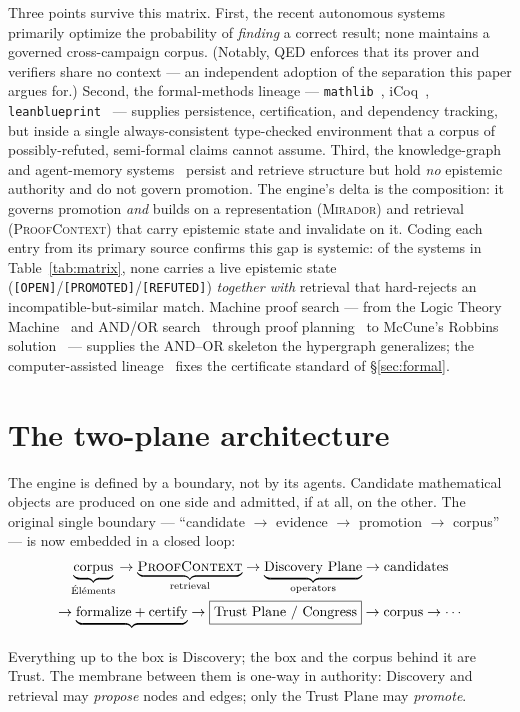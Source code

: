 \documentclass[11pt]{amsart}
\theoremstyle{definition}
\theoremstyle{remark}
\newcommand{\mirador}{\textsc{Mirador}}
\newcommand{\pc}{\textsc{ProofContext}}
\newcommand{\state}[1]{\texttt{[#1]}}
\begin{document}
\noindent Three points survive this matrix. First, the recent autonomous
systems~\cite{Aletheia26,QED26,RMA26} primarily optimize the probability of
\emph{finding} a correct result; none maintains a governed cross-campaign
corpus. (Notably, QED enforces that its prover and verifiers share no context ---
an independent adoption of the separation this paper argues for.) Second, the
formal-methods lineage --- \texttt{mathlib}~\cite{mathlib20},
iCoq~\cite{Celik17}, \texttt{leanblueprint}~\cite{Massot,Tao23} --- supplies
persistence, certification, and dependency tracking, but inside a single
always-consistent type-checked environment that a corpus of possibly-refuted,
semi-formal claims cannot assume. Third, the knowledge-graph and agent-memory
systems~\cite{TheoremGraph26,MaRDI23,Zep25,Yadav26} persist and retrieve
structure but hold \emph{no} epistemic authority and do not govern promotion.
The engine's delta is the composition: it governs promotion \emph{and} builds
on a representation (\mirador{}) and retrieval (\pc{}) that carry epistemic
state and invalidate on it. Coding each entry from its primary source confirms
this gap is systemic: of the systems in Table~\ref{tab:matrix}, none carries a live
epistemic state (\state{OPEN}/\state{PROMOTED}/\state{REFUTED}) \emph{together
with} retrieval that hard-rejects an incompatible-but-similar match. Machine
proof search --- from the Logic Theory
Machine~\cite{NewellSimon57} and AND/OR search~\cite{Nilsson71} through proof
planning~\cite{Bundy88} to McCune's Robbins solution~\cite{McCune97} --- supplies
the AND--OR skeleton the hypergraph generalizes; the computer-assisted
lineage~\cite{AppelHaken77,Gonthier08,Hales17,Heule16,deBruijn70} fixes the
certificate standard of \S\ref{sec:formal}.

\section{The two-plane architecture}\label{sec:planes}

The engine is defined by a boundary, not by its agents. Candidate mathematical
objects are produced on one side and admitted, if at all, on the other. The
original single boundary --- ``candidate $\to$ evidence $\to$ promotion $\to$
corpus'' --- is now embedded in a closed loop:
\[
\begin{gathered}
\underbrace{\text{corpus}}_{\text{\'El\'ements}}
\to
\underbrace{\pc{}}_{\text{retrieval}}
\to
\underbrace{\text{Discovery Plane}}_{\text{operators}}
\to
\text{candidates}\\
\to
\underbrace{\text{formalize}+\text{certify}}_{}
\to
\boxed{\text{Trust Plane / Congress}}
\to
\text{corpus}\to\cdots
\end{gathered}
\]
Everything up to the box is Discovery; the box and the corpus behind it are
Trust. The membrane between them is one-way in authority: Discovery and
retrieval may \emph{propose} nodes and edges; only the Trust Plane may
\emph{promote}.
\end{document}
